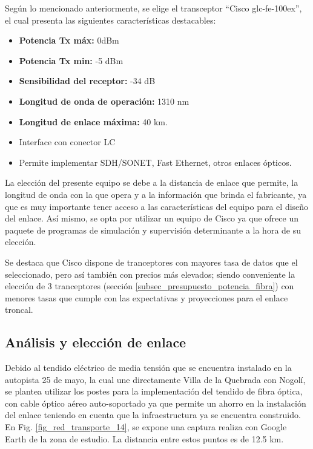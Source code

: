 \documentclass[12pt,a4paper]{book}
\begin{document}
Según lo mencionado anteriormente, se elige el transceptor “Cisco glc-fe-100ex”, el cual presenta las siguientes características destacables:

\begin{itemize}
\item \textbf{Potencia Tx máx:} 0dBm
\item \textbf{Potencia Tx min: }-5 dBm
\item \textbf{Sensibilidad del receptor:} -34 dB
\item \textbf{Longitud de onda de operación:} 1310 nm
\item \textbf{Longitud de enlace máxima:} 40 km.
\item Interface con conector LC
\item Permite implementar SDH/SONET, Fast Ethernet, otros enlaces ópticos.
\end{itemize}

La elección del presente equipo se debe a la distancia de enlace que permite, la longitud de onda con la que opera y a la información que brinda el fabricante, ya que es muy importante tener acceso a las características del equipo para el diseño del enlace. Así mismo, se opta por utilizar un equipo de Cisco ya que ofrece un paquete de programas de simulación y supervisión determinante a la hora de su elección.

Se destaca que Cisco dispone de tranceptores con mayores tasa de datos que el seleccionado, pero así también con precios más elevados; siendo conveniente la elección de 3 tranceptores (sección \ref{subsec_presupuesto_potencia_fibra}) con menores tasas que cumple con las expectativas y proyecciones para el enlace troncal. 

\subsection{Análisis y elección de enlace}

Debido al tendido eléctrico de media tensión que se encuentra instalado en la autopista 25 de mayo, la cual une directamente Villa de la Quebrada con Nogolí, se plantea utilizar los postes para la implementación del tendido de fibra óptica, con cable óptico aéreo auto-soportado ya que permite un ahorro en la instalación del enlace teniendo en cuenta que la infraestructura ya se encuentra construido. En Fig. \ref{fig_red_transporte_14}, se expone una captura realiza con Google Earth de la zona de estudio. La distancia entre estos puntos es de 12.5 km.
\end{document}
